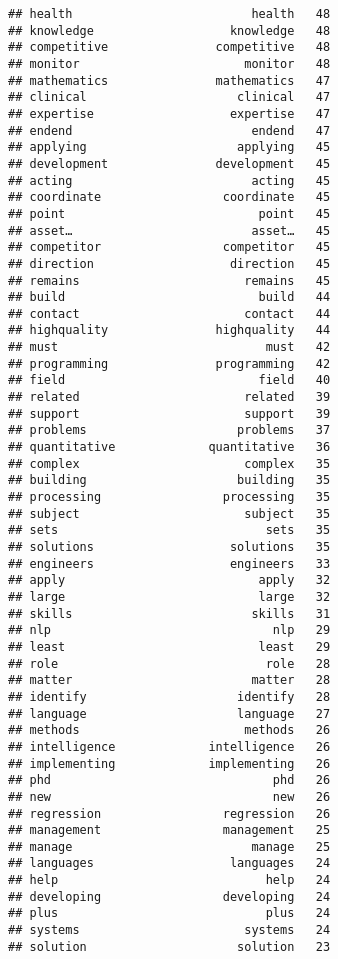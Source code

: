 \documentclass[]{article}
\begin{document}
\begin{verbatim}
## health                         health   48
## knowledge                   knowledge   48
## competitive               competitive   48
## monitor                       monitor   48
## mathematics               mathematics   47
## clinical                     clinical   47
## expertise                   expertise   47
## endend                         endend   47
## applying                     applying   45
## development               development   45
## acting                         acting   45
## coordinate                 coordinate   45
## point                           point   45
## asset…                         asset…   45
## competitor                 competitor   45
## direction                   direction   45
## remains                       remains   45
## build                           build   44
## contact                       contact   44
## highquality               highquality   44
## must                             must   42
## programming               programming   42
## field                           field   40
## related                       related   39
## support                       support   39
## problems                     problems   37
## quantitative             quantitative   36
## complex                       complex   35
## building                     building   35
## processing                 processing   35
## subject                       subject   35
## sets                             sets   35
## solutions                   solutions   35
## engineers                   engineers   33
## apply                           apply   32
## large                           large   32
## skills                         skills   31
## nlp                               nlp   29
## least                           least   29
## role                             role   28
## matter                         matter   28
## identify                     identify   28
## language                     language   27
## methods                       methods   26
## intelligence             intelligence   26
## implementing             implementing   26
## phd                               phd   26
## new                               new   26
## regression                 regression   26
## management                 management   25
## manage                         manage   25
## languages                   languages   24
## help                             help   24
## developing                 developing   24
## plus                             plus   24
## systems                       systems   24
## solution                     solution   23

\end{verbatim}
\end{document}
